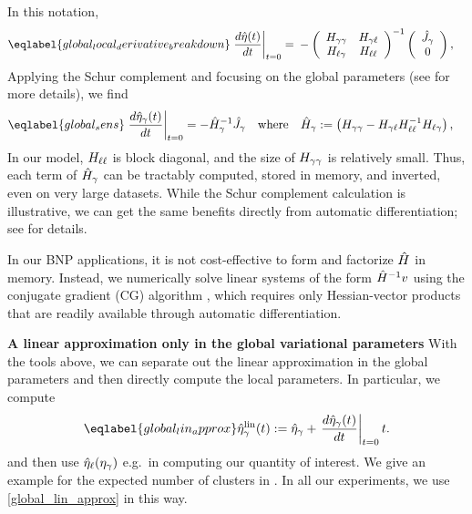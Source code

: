 In this notation,
%
\begin{align} \eqlabel{global_local_derivative_breakdown}
%
\fracat{d \etaopt(\t)}{d \t}{t = 0} ={}&
-\left(
\begin{array}{cc}
   \hess{\gamma\gamma} & \hess{\gamma\ell} \\
   \hess{\ell\gamma}     & \hess{\ell\ell} \\
\end{array}
\right)^{-1}
\left( \begin{array}{c} \crosshessian_\gamma \\ 0 \end{array}\right),
%
\end{align}
%
Applying the Schur complement and focusing on the global parameters (see
 for more details), we find
%
\begin{align}\eqlabel{global_sens}
  \fracat{d \etaopt_\gamma(\t)}{d \t}{t = 0} &=
  - \hessopt_\gamma^{-1}\crosshessian_\gamma
  \mathwhere
  \hessopt_\gamma := \left(\hess{\gamma\gamma} -
        \hess{\gamma\ell} \hess{\ell\ell}^{-1} \hess{\ell\gamma}\right),
\end{align}
%
In our model, $H_{\ell\ell}$ is block diagonal, and the size of
$H_{\gamma\gamma}$ is relatively small. Thus, each term of $\hat{H}_\gamma$
can be tractably computed, stored in memory, and inverted, even on very large
datasets. While the Schur complement calculation is illustrative, we can get the
same benefits directly from automatic differentiation; see 
for details.

In our BNP applications, it is not cost-effective to form and factorize
$\hat{H}$ in memory.  Instead, we numerically solve linear systems of the form
$\hat{H}^{-1} v$ using the conjugate gradient (CG) algorithm \citep[Chapter
5]{nocedal:2006:numerical}, which requires only Hessian-vector products that are
readily available through automatic differentiation.

\noindent \textbf{A linear approximation only in the global variational parameters}
%
With the tools above, we can separate out the linear approximation in the global
parameters and then directly compute the local parameters. In particular, we
compute
%
\begin{align}\eqlabel{global_lin_approx}
  \etalin_\gamma(\t) := \etaopt_\gamma +
  \fracat{d \etaopt_\gamma(\t)}{d \t}{\t=0} \t .
\end{align}
%
and then use $\hat\eta_{\ell}(\eta_{\gamma})$ e.g.\ in computing our quantity of
interest. We give an example for the expected number of clusters in
.  In all our experiments, we use
\eqref{global_lin_approx} in this way.
